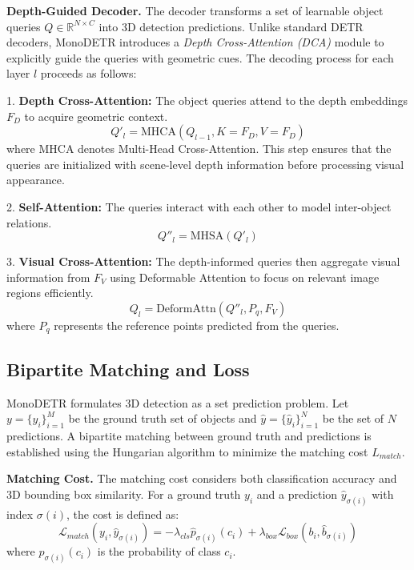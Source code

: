 \noindent\textbf{Depth-Guided Decoder.}
The decoder transforms a set of learnable object queries $Q \in \mathbb{R}^{N \times C}$ into 3D detection predictions. Unlike standard DETR decoders, MonoDETR introduces a \textit{Depth Cross-Attention (DCA)} module to explicitly guide the queries with geometric cues. The decoding process for each layer $l$ proceeds as follows:

1.  \textbf{Depth Cross-Attention:} The object queries attend to the depth embeddings $F_D$ to acquire geometric context.
    \begin{equation}
        Q'_{l} = \text{MHCA}(Q_{l-1}, K=F_D, V=F_D)
    \end{equation}
    where MHCA denotes Multi-Head Cross-Attention. This step ensures that the queries are initialized with scene-level depth information before processing visual appearance.
    
2.  \textbf{Self-Attention:} The queries interact with each other to model inter-object relations.
    \begin{equation}
        Q''_{l} = \text{MHSA}(Q'_{l})
    \end{equation}
    
3.  \textbf{Visual Cross-Attention:} The depth-informed queries then aggregate visual information from $F_V$ using Deformable Attention to focus on relevant image regions efficiently.
    \begin{equation}
        Q_{l} = \text{DeformAttn}(Q''_{l}, P_q, F_V)
    \end{equation}
    where $P_q$ represents the reference points predicted from the queries.

\subsection{Bipartite Matching and Loss}
MonoDETR formulates 3D detection as a set prediction problem. Let $y = \{y_i\}_{i=1}^{M}$ be the ground truth set of objects and $\hat{y} = \{\hat{y}_i\}_{i=1}^{N}$ be the set of $N$ predictions. A bipartite matching between ground truth and predictions is established using the Hungarian algorithm to minimize the matching cost $L_{match}$.

\noindent\textbf{Matching Cost.}
The matching cost considers both classification accuracy and 3D bounding box similarity. For a ground truth $y_i$ and a prediction $\hat{y}_{\sigma(i)}$ with index $\sigma(i)$, the cost is defined as:
\begin{equation}
    \mathcal{L}_{match}(y_i, \hat{y}_{\sigma(i)}) = -\lambda_{cls} \hat{p}_{\sigma(i)}(c_i) + \lambda_{box} \mathcal{L}_{box}(b_i, \hat{b}_{\sigma(i)})
\end{equation}
where $\hat{p}_{\sigma(i)}(c_i)$ is the probability of class $c_i$.

